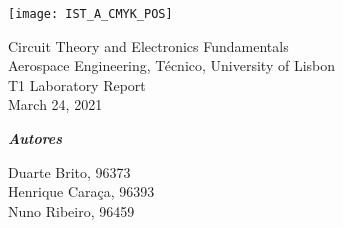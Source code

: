 
\thispagestyle {empty}

\texttt{[image: IST\_A\_CMYK\_POS]}

\begin{center}
%

\vspace{1.0cm}


\vspace{1cm}
{\FontLb Circuit Theory and Electronics Fundamentals} \\ %
\vspace{1cm}
{\FontSn Aerospace Engineering, Técnico, University of Lisbon} \\ %
\vspace{1cm}
{\FontSn T1 Laboratory Report} \\
\vspace{1cm}
{\FontSn March 24, 2021} \\ %
\vspace{1cm}

\textbf{\emph{Autores}\\[0.06in]}

Duarte Brito, 96373\\
Henrique Caraça, 96393\\
Nuno Ribeiro, 96459\\

\vspace{2cm}
\end{center}

